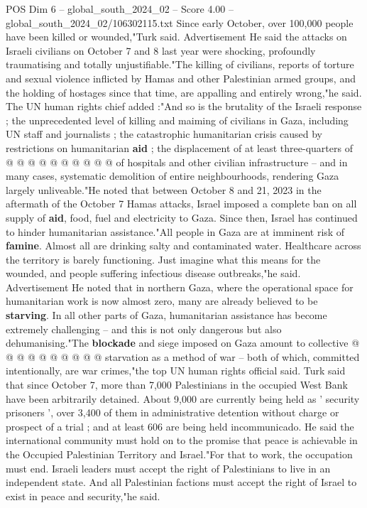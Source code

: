 \begin{textsample}{POS Dim 6 – global\_south\_2024\_02 – Score 4.00 – global\_south\_2024\_02/106302115.txt}
Since early October, over 100,000 people have been killed or wounded,"Turk said.
Advertisement He said the attacks on Israeli civilians on October 7 and 8 last year were shocking, profoundly traumatising and totally unjustifiable."The killing of civilians, reports of torture and sexual violence inflicted by Hamas and other Palestinian armed groups, and the holding of hostages since that time, are appalling and entirely wrong,"he said.
The UN human rights chief added :"And so is the brutality of the Israeli response ; the unprecedented level of killing and maiming of civilians in Gaza, including UN staff and journalists ; the catastrophic humanitarian crisis caused by restrictions on humanitarian \textbf{aid} ; the displacement of at least three-quarters of @ @ @ @ @ @ @ @ @ @ of hospitals and other civilian infrastructure -- and in many cases, systematic demolition of entire neighbourhoods, rendering Gaza largely unliveable."He noted that between October 8 and 21, 2023 in the aftermath of the October 7 Hamas attacks, Israel imposed a complete ban on all supply of \textbf{aid}, food, fuel and electricity to Gaza.
Since then, Israel has continued to hinder humanitarian assistance."All people in Gaza are at imminent risk of \textbf{famine}.
Almost all are drinking salty and contaminated water.
Healthcare across the territory is barely functioning.
Just imagine what this means for the wounded, and people suffering infectious disease outbreaks,"he said.
Advertisement He noted that in northern Gaza, where the operational space for humanitarian work is now almost zero, many are already believed to be \textbf{starving}.
In all other parts of Gaza, humanitarian assistance has become extremely challenging -- and this is not only dangerous but also dehumanising."The \textbf{blockade} and siege imposed on Gaza amount to collective @ @ @ @ @ @ @ @ @ @ starvation as a method of war -- both of which, committed intentionally, are war crimes,"the top UN human rights official said.
Turk said that since October 7, more than 7,000 Palestinians in the occupied West Bank have been arbitrarily detained.
About 9,000 are currently being held as ' security prisoners ', over 3,400 of them in administrative detention without charge or prospect of a trial ; and at least 606 are being held incommunicado.
He said the international community must hold on to the promise that peace is achievable in the Occupied Palestinian Territory and Israel."For that to work, the occupation must end.
Israeli leaders must accept the right of Palestinians to live in an independent state.
And all Palestinian factions must accept the right of Israel to exist in peace and security,"he said.

\end{textsample}
